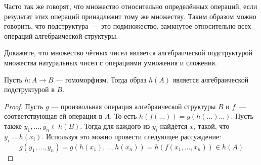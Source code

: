 Часто так же говорят, что множество  относительно определённых операций, если результат этих операций принадлежит тому же множеству. Таким образом можно говорить, что подструктура~— это подмножество, замкнутое относительно всех операций алгебраической структуры.

\begin{exercise}
	Докажите, что множество чётных чисел является алгебраической подструктурой множества натуральных чисел с операциями умножения и сложения.
\end{exercise}

\begin{thm}
	Пусть $h:A\to B$ — гомоморфизм. Тогда образ $h(A)$ является алгебраической подструктурой в $B$.
\end{thm}
\begin{proof}
	Пусть $g$ — произвольная операция алгебраической структуры $B$ и $f$~— соответствующая ей операция в $A$. То есть $h(f(\ldots))=g(h(\ldots)\ldots)$. Пусть также $y_1,\ldots,y_n\in h(B)$. Тогда для каждого из $y_i$ найдётся $x_i$ такой, что $y_i=h(x_i)$. Используя это можно провести следующее рассуждение:
	\[
	g(y_1,\ldots,y_n) = g(h(x_1),\ldots,h(x_n)) = h(f(x_1,\ldots,x_n)) \in h(A)
	\]
\end{proof}